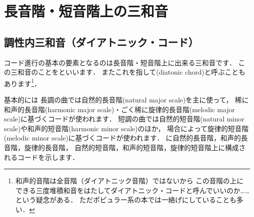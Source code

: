 \documentclass[dvipdfmx,uplatex,b5paper,openany,jbase=12Q,nomag*,textwidth-limit=44%
               ]{gachimuchi}
\begin{document}


%

\chapter{長音階・短音階上の三和音}
\section{調性内三和音（ダイアトニック・コード）}
コード進行の基本の要素となるのは長音階・短音階上に出来る三和音です．
この三和音のことをといいます\cite[p.23]{ptSHIMIZU1}．
またこれを指して\xkanjispace(diatonic chord)と呼ぶこともあります\footnote{
  和声的音階は全音階（ダイアトニック音階）ではないから
  この音階の上にできる三度堆積和音をはたしてダイアトニック・コードと呼んでいいのか……という疑念がある．
  ただポピュラー系の本では一絡げにしていることも多い．
}．

基本的には
長調の曲では自然的長音階(natural major scale)を主に使って，
稀に和声的長音階(harmonic major scale)・ごく稀に旋律的長音階(melodic major scale)に基づくコードが使われます．
短調の曲では自然的短音階(natural minor scale)や和声的短音階(harmonic minor scale)のほか，
場合によって旋律的短音階(melodic minor scale)に基づくコードが使われます．
に自然的長音階，和声的長音階，旋律的長音階，
自然的短音階，和声的短音階，旋律的短音階上に構成されるコードを示します．
\end{document}
